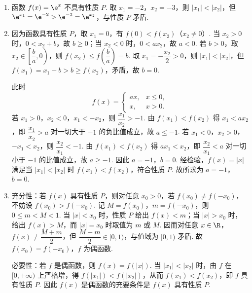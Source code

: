 \begin{solution}
\begin{enumerate}
\item 函数 \(f(x)=\e^x\) 不具有性质 \(P\). 取 \(x_1=-2\)，\(x_2=-3\)，则 \(|x_1|<|x_2|\)，但 \(\e^{x_1}=\e^{-2}>\e^{-3}=\e^{x_2}\)，与性质 \(P\) 矛盾.

\item 因为函数具有性质 \(P\)，取 \(x_1=0\)，有 \(f(0)<f(x_2)\)（\(x_2\ne0\)）. 当 \(x_2>0\) 时，\(0<x_2+b\)，故 \(b\ge0\)；当 \(x_2<0\) 时，\(0<ax_2\)，故 \(a<0\). 若 \(b>0\)，取 \(x_2\in\left[\dfrac{b}{a},0\right)\)，则 \(f(x_2)\le f\left(\dfrac{b}{a}\right)=b\). 取 \(x_1=-\dfrac{x_2}{2}>0\)，则 \(|x_1|<|x_2|\)，但 \(f(x_1)=x_1+b>b\ge f(x_2)\)，矛盾，故 \(b=0\).

此时
\[
f(x)=
\begin{cases}
ax,&x\le0,\\
x,&x>0.
\end{cases}
\]
若 \(x_1>0\)，\(x_2<0\)，\(x_1<-x_2\)，则 \(\dfrac{x_1}{x_2}>-1\). 由 \(f(x_1)<f(x_2)\) 得 \(x_1<ax_2\)，即 \(\dfrac{x_1}{x_2}>a\) 对一切大于 \(-1\) 的负比值成立，故 \(a\le-1\). 若 \(x_1<0\)，\(x_2>0\)，\(-x_1<x_2\)，则 \(\dfrac{x_2}{x_1}<-1\). 由 \(f(x_1)<f(x_2)\) 得 \(ax_1<x_2\)，即 \(\dfrac{x_2}{x_1}<a\) 对一切小于 \(-1\) 的比值成立，故 \(a\ge-1\). 因此 \(a=-1\)，\(b=0\). 经检验，\(f(x)=|x|\) 满足当 \(|x_1|<|x_2|\) 时 \(f(x_1)<f(x_2)\)，符合性质 \(P\). 故所求为 \(a=-1\)，\(b=0\).

\item 充分性：若 \(f(x)\) 具有性质 \(P\)，则对任意 \(x_0>0\)，若 \(f(x_0)\ne f(-x_0)\)，不妨设 \(f(x_0)>f(-x_0)\). 记 \(M=f(x_0)\)，\(m=f(-x_0)\)，则 \(0\le m<M<1\). 当 \(|x|<x_0\) 时，性质 \(P\) 给出 \(f(x)<m\)；当 \(|x|>x_0\) 时，给出 \(f(x)>M\)，而 \(|x|=x_0\) 时取值为 \(m\) 或 \(M\). 因而对任意 \(x\in\R\)，\(f(x)\ne\dfrac{M+m}{2}\)，但 \(\dfrac{M+m}{2}\in[0,1)\)，与值域为 \([0,1)\) 矛盾. 故 \(f(x_0)=f(-x_0)\)，\(f\) 为偶函数.

必要性：若 \(f\) 是偶函数，则 \(f(x)=f(|x|)\). 当 \(|x_1|<|x_2|\) 时，由 \(f\) 在 \([0,+\infty)\) 上严格增，得 \(f(|x_1|)<f(|x_2|)\)，从而 \(f(x_1)<f(x_2)\)，即 \(f\) 具有性质 \(P\). 因此 \(f(x)\) 是偶函数的充要条件是 \(f(x)\) 具有性质 \(P\).
\end{enumerate}
\end{solution}
